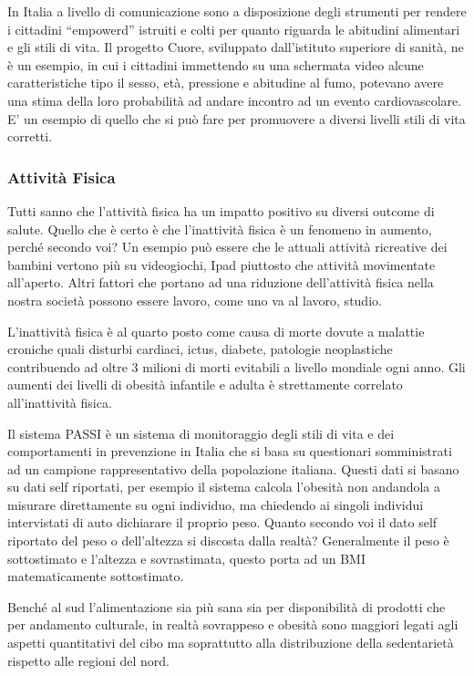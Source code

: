 In Italia a livello di comunicazione sono a disposizione degli strumenti
per rendere i cittadini ``empowerd'' istruiti e colti per quanto
riguarda le abitudini alimentari e gli stili di vita. Il progetto Cuore,
sviluppato dall'istituto superiore di sanità, ne è un esempio, in cui i
cittadini immettendo su una schermata video alcune caratteristiche tipo
il sesso, età, pressione e abitudine al fumo, potevano avere una stima
della loro probabilità ad andare incontro ad un evento cardiovascolare.
E' un esempio di quello che si può fare per promuovere a diversi livelli
stili di vita corretti.

\subsubsection{Attività Fisica}

Tutti sanno che l'attività fisica ha un impatto positivo su diversi
outcome di salute. Quello che è certo è che l'inattività fisica è un
fenomeno in aumento, perché secondo voi? Un esempio può essere che le
attuali attività ricreative dei bambini vertono più su videogiochi, Ipad
piuttosto che attività movimentate all'aperto. Altri fattori che portano
ad una riduzione dell'attività fisica nella nostra società possono
essere lavoro, come uno va al lavoro, studio.

L'inattività fisica è al quarto posto come causa di morte dovute a
malattie croniche quali disturbi cardiaci, ictus, diabete, patologie
neoplastiche contribuendo ad oltre 3 milioni di morti evitabili a
livello mondiale ogni anno. Gli aumenti dei livelli di obesità infantile
e adulta è strettamente correlato all'inattività fisica.

Il sistema PASSI è un sistema di monitoraggio degli stili di vita e dei
comportamenti in prevenzione in Italia che si basa su questionari
somministrati ad un campione rappresentativo della popolazione italiana.
Questi dati si basano su dati self riportati, per esempio il sistema
calcola l'obesità non andandola a misurare direttamente su ogni
individuo, ma chiedendo ai singoli individui intervistati di auto
dichiarare il proprio peso. Quanto secondo voi il dato self riportato
del peso o dell'altezza si discosta dalla realtà? Generalmente il peso è
sottostimato e l'altezza e sovrastimata, questo porta ad un BMI
matematicamente sottostimato.

Benché al sud l'alimentazione sia più sana sia per disponibilità di
prodotti che per andamento culturale, in realtà sovrappeso e obesità
sono maggiori legati agli aspetti quantitativi del cibo ma soprattutto
alla distribuzione della sedentarietà rispetto alle regioni del nord.


